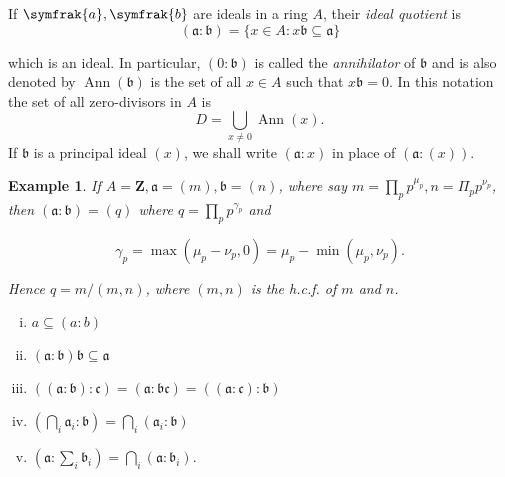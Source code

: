 \documentclass[class=book, crop=false]{standalone}
\newtheorem*{example}{Example}
\theoremstyle{definition}
\theoremstyle{remark}
\begin{document}
If $\symfrak{a}, \symfrak{b}$ are ideals in a ring $A$, their \textit{ideal
  quotient} is
\[
  (\mathfrak{a}: \mathfrak{b})=\{x \in A: x \mathfrak{b} \subseteq \mathfrak{a}\}
\]

which is an ideal. In particular, $(0: \mathfrak{b})$ is called the
\textit{annihilator} of $\mathfrak{b}$ and is also denoted by
$\operatorname{Ann}(\mathfrak{b})$ is the set of all $x \in A$ such that
$x \mathfrak{b}=0$. In this notation the set of all zero-divisors in $A$ is
\[
  D=\bigcup_{x \neq 0} \operatorname{Ann}(x).
\]
If $\mathfrak{b}$ is a principal ideal $(x)$, we shall write $(\mathfrak{a}: x)$
in place of $(\mathfrak{a}:(x))$.
\begin{example}
  If $A=\mathbf{Z}, \mathfrak{a}=(m), \mathfrak{b}=(n)$, where say
  $m=\prod_{p} p^{\mu_{p}}, n=\Pi_{p} p^{\nu_{p}}$, then
  $(\mathfrak{a}: \mathfrak{b})=(q)$ where $q=\prod_{p} p^{\gamma_{p}}$ and

\[
  \gamma_{p}=\max \left(\mu_{p}-\nu_{p}, 0\right)=\mu_{p}-\min \left(\mu_{p}, \nu_{p}\right).
\]

Hence $q=m /(m, n)$, where $(m, n)$ is the h.c.f. of $m$ and $n$.
\end{example}
\begin{exercise}\label{exc:1.12}
  \begin{enumerate}[i)]
    \item $a \subseteq(a: b)$
    \item $(\mathfrak{a}: \mathfrak{b}) \mathfrak{b} \subseteq \mathfrak{a}$
    \item
          $((\mathfrak{a}: \mathfrak{b}): \mathfrak{c})=(\mathfrak{a}: \mathfrak{b c})=((\mathfrak{a}: \mathfrak{c}): \mathfrak{b})$
    \item
          $\left(\bigcap_{i} \mathfrak{a}_{i}: \mathfrak{b}\right)=\bigcap_{i}\left(\mathfrak{a}_{i}: \mathfrak{b}\right)$
    \item
          $\left(\mathfrak{a}: \sum_{i} \mathfrak{b}_{i}\right)=\bigcap_{i}\left(\mathfrak{a}: \mathfrak{b}_{i}\right)$.
  \end{enumerate}
\end{exercise}
\end{document}

